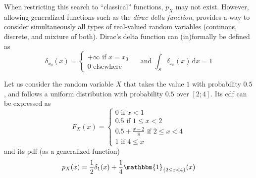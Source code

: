 \documentclass[a4paper,11pt]{article}
\newcommand{\Prob}{\mathbb{P}}
\theoremstyle{defi}
\numberwithin{thmCounter}{section}
\begin{document}
\begin{definition}
\begin{itemize}
  \end{itemize}
\end{definition}
\begin{remark}
  When restricting this search to ``classical'' functions, $p_X$ may not exist. However, allowing generalized functions such as the \emph{dirac delta function}, provides a way to consider simultaneously all types of real-valued random variables (continous, discrete, and mixture of both). Dirac's delta function can (in)formally be defined as
  \begin{equation*}
    \delta_{x_0}(x) = 
    \begin{cases}
      +\infty \text{ if } x=x_0 \\
      0 \text{ elsewhere}
    \end{cases} \quad \text{ and }
    \int_S \delta_{x_0}(x)\,\mathrm{d}x = 1
  \end{equation*}
\end{remark}
\begin{example}
  \label{ex:X_rv}
  Let us consider the random variable $X$ that takes the value $1$ with probability $0.5$, and follows a uniform distribution with probability $0.5$ over $[2;4]$. Its cdf can be expressed as
  \begin{equation*}
    F_X(x) =
    \begin{cases}
      0 \text{ if } x < 1 \\
      0.5 \text{ if } 1 \leq x < 2 \\
      0.5 + \frac{x-2}{8} \text{ if } 2 \leq x < 4 \\
      1 \text{ if } 4 \leq x
    \end{cases}
  \end{equation*}
  and its pdf (as a generalized function)
  \begin{equation*}
    p_X(x) = \frac{1}{2}\delta_{1}(x) + \frac{1}{4}\mathbbm{1}_{\{2\leq x < 4\}}(x) 
  \end{equation*}
\end{example}
\end{document}
